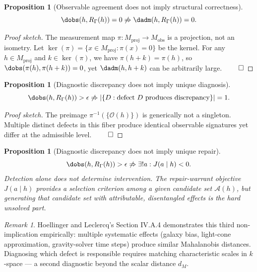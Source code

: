 \documentclass[12pt,a4paper,twoside,openright]{book}
\theoremstyle{plain}
\newtheorem{proposition}[theorem]{Proposition}
\theoremstyle{definition}
\theoremstyle{remark}
\newtheorem{remark}[theorem]{Remark}
\newcommand{\Mproj}{M_{\mathrm{proj}}}
\newcommand{\Mobs}{M_{\mathrm{obs}}}
\newcommand{\RGam}{R_\Gamma}
\newcommand{\Repobj}{J}
\begin{document}
\begin{proposition}[Observable agreement does not imply structural correctness]
\[
\dobs(h, \RGam(h)) = 0 \not\Rightarrow \dadm(h, \RGam(h)) = 0.
\]
\end{proposition}

\begin{proof}[Proof sketch]
The measurement map $\pi: \Mproj \to \Mobs$ is a projection, not an isometry. Let $\ker(\pi) = \{x \in \Mproj : \pi(x) = 0\}$ be the kernel. For any $h \in \Mproj$ and $k \in \ker(\pi)$, we have $\pi(h + k) = \pi(h)$, so $\dobs(\pi(h), \pi(h+k)) = 0$, yet $\dadm(h, h+k)$ can be arbitrarily large. $\qed$
\end{proof}

\begin{proposition}[Diagnostic discrepancy does not imply unique diagnosis]
\[
\dobs(h, \RGam(h)) > \epsilon \not\Rightarrow |\{D : \text{defect } D \text{ produces discrepancy}\}| = 1.
\]
\end{proposition}

\begin{proof}[Proof sketch]
The preimage $\pi^{-1}(\{\mathcal{O}(h)\})$ is generically not a singleton. Multiple distinct defects in this fiber produce identical observable signatures yet differ at the admissible level. $\qed$
\end{proof}

\begin{proposition}[Diagnostic discrepancy does not imply unique repair]
\[
\dobs(h, \RGam(h)) > \epsilon \not\Rightarrow \exists! a : \Repobj(a \mid h) < 0.
\]
Detection alone does not determine intervention. The repair-warrant objective $\Repobj(a \mid h)$ provides a selection criterion among a \emph{given} candidate set $\mathcal{A}(h)$, but generating that candidate set with attributable, disentangled effects is the hard unsolved part.
\end{proposition}

\begin{remark}
Hoellinger and Leclercq's Section IV.A.4 demonstrates this third non-implication empirically: multiple systematic effects (galaxy bias, light-cone approximation, gravity-solver time steps) produce similar Mahalanobis distances. Diagnosing which defect is responsible requires matching characteristic scales in $k$-space --- a second diagnostic beyond the scalar distance $d_M$.
\end{remark}


\end{document}
